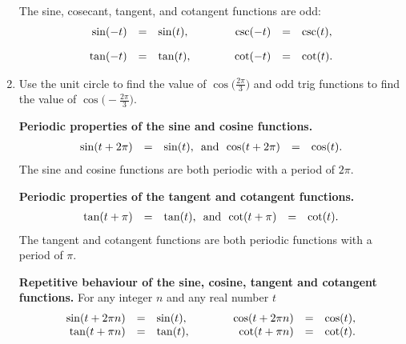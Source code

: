 \begin{enumerate}
{{     The sine, cosecant, tangent, and cotangent functions are odd:
     \begin{eqnarray*}
       \begin{array}{rcl@{\hspace{4em}}rcl}
         \sin(-t) & = & \sin(t), & \csc(-t) & = & \csc(t),\\ [10pt]
         \tan(-t) & = & \tan(t), & \cot(-t) & = & \cot(t).
       \end{array}
     \end{eqnarray*}

   }
 }


\item Use the unit circle to find the value of
  $\displaystyle \cos \Bigg(\frac{2\pi}{3}\Bigg)$ and odd trig
  functions to find the value of
  $\displaystyle \cos \Bigg(-\frac{2\pi}{3}\Bigg)$.

\vfill

   \noindent\colorbox{blue!10}{%
   \parbox{\dimexpr\linewidth}%
   {%
     \textbf{Periodic properties of the sine and cosine functions.}
     \begin{eqnarray*}
       \begin{array}{rcl@{~~\textrm{and}~~}rcl}
         \sin(t+2\pi) & = & \sin(t), & \cos(t+2\pi) & = & \cos(t).
       \end{array}
     \end{eqnarray*}
     The sine and cosine functions are both periodic with a period of $2\pi$.
   }
 }
 \noindent\colorbox{blue!10}{%
   \parbox{\dimexpr\linewidth}%
   {%
     \textbf{Periodic properties of the tangent and cotangent functions.}
     \begin{eqnarray*}
       \begin{array}{rcl@{~~\textrm{and}~~}rcl}
         \tan(t+\pi) & = & \tan(t), & \cot(t+\pi) & = & \cot(t).
       \end{array}
     \end{eqnarray*}
     The tangent and cotangent functions are both periodic functions with a period of $\pi$.

     \textbf{Repetitive behaviour of the sine, cosine, tangent and cotangent functions.}
     For any integer $n$ and any real number $t$
     \begin{eqnarray*}
       \begin{array}{rcl@{\hspace{4em}}rcl}
         \sin(t+2\pi n) & = & \sin(t), & \cos(t+2\pi n) & = & \cos(t), \\
         \tan(t+\pi n) & = & \tan(t), & \cot(t+\pi n) & = & \cot(t).
       \end{array}
     \end{eqnarray*}

}}
\end{enumerate}
